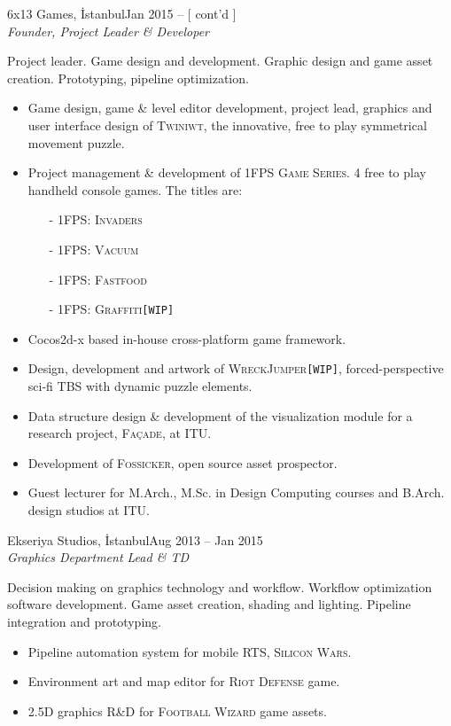 \documentclass[8pt]{scrartcl}
\newenvironment{xplist}{%
  \newcommand\xpitem[4]{%
    {\color{header}%
      \sc##2\hfill ##1}\\[2pt]
    {\Large\textit{##3}
      \smallskip} \\%
    {##4\medskip}%

  }}%
{\setlist{}}
\newcommand{\project}[1]{\textsc{\color{teal}#1}}
\begin{document}
\begin{xplist}
    \xpitem%
    {Jan 2015 -- [ cont'd ]}%
    {6x13 Games, İstanbul}%
    {Founder, Project Leader \& Developer}{%
      Project leader.   Game design  and development.   Graphic design
      and game asset creation. Prototyping, pipeline optimization.
      \begin{itemize}
      \item Game design, game \& level editor development, project
        lead, graphics and user interface design of \project{Twiniwt},
        the innovative, free to play symmetrical movement puzzle.
      \item Project  management \&  development of  \project{1FPS Game
          Series}.  4 free to play  handheld console games. The titles
        are:
        \begin{itemize}
        \item[-] \project{1FPS: Invaders}
        \item[-] \project{1FPS: Vacuum}
        \item[-] \project{1FPS: Fastfood}
        \item[-] \project{1FPS: Graffiti}\texttt{\small[WIP]}
        \end{itemize}
      \item Cocos2d-x based in-house cross-platform game framework.
      \item      Design,      development     and      artwork      of
        \project{WreckJumper}\texttt{\small[WIP]},  forced-perspective
        sci-fi TBS with dynamic puzzle elements.
      \item Data structure design  \& development of the visualization
        module for a research project, \project{Façade}, at ITU.
      \item  Development  of  \project{Fossicker}, open  source  asset
        prospector.
      \item  Guest lecturer  for  M.Arch., M.Sc.  in Design  Computing
        courses and B.Arch. design studios at ITU.
      \end{itemize}}%
    \xpitem%
    {Aug 2013 -- Jan 2015}%
    {Ekseriya Studios, İstanbul}%
    {Graphics Department Lead \& TD}{%
      Decision making  on graphics  technology and  workflow. Workflow
      optimization software development.  Game asset creation, shading
      and lighting. Pipeline integration and prototyping.

      \begin{itemize}
      \item  Pipeline   automation  system for    mobile   RTS,
        \project{Silicon Wars}.
      \item Environment art and  map editor for \project{Riot Defense}
        game.
      \item 2.5D graphics R\&D for \project{Football Wizard} game
        assets.
      \end{itemize}}%
\end{xplist}
\end{document}
